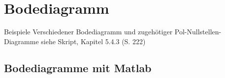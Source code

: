 \section{Bodediagramm}

Beispiele Verschiedener Bodediagramm und zugehötiger Pol-Nullstellen-Diagramme siehe Skript, Kapitel 5.4.3 (S. 222)

\subsection{Bodediagramme mit Matlab}


